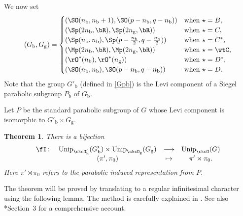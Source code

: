 \documentclass[12pt,a4paper]{amsart}
\numberwithin{equation}{section}
\newtheorem{thm}{Theorem}[section]
\theoremstyle{remark}
\def\Unip{\mathrm{Unip}}
\begin{document}
We now set
\[
  (G_{\mathrm b},G_{\mathrm g}) =
  \begin{cases}
    (\SO(n_{\mathrm b},n_{\mathrm b}+1),\SO(p-n_{\mathrm b},q-n_{\mathrm b})) & \text{when } \star = B, \\
    (\Sp(2n_{\mathrm b},\bR),\Sp(2n_{\mathrm g},\bR)) & \text{when } \star = C, \\
    (\Sp(n_{\mathrm b},n_{\mathrm b}), \Sp(p-\frac{n_{\mathrm b}}{2},q-\frac{n_{\mathrm b}}{2})) & \text{when } \star = C^{*}, \\
    (\Mp(2n_{\mathrm b},\bR),\Mp(2n_{\mathrm g},\bR)) & \text{when } \star = \wtC, \\
    (\rO^{*}(n_{\mathrm b}), \rO^{*}(n_{\mathrm g})) & \text{when } \star = D^{*}, \\
    (\SO(n_{\mathrm b},n_{\mathrm b}), \SO(p-n_{\mathrm b},q-n_{\mathrm b}) )& \text{when } \star = D. \\
  \end{cases}
\]
Note that the group $G'_{\mathrm b}$ (defined in \eqref{Gpb}) is the Levi component of a Siegel parabolic subgroup $P_{\mathrm b}$ of $G_{\mathrm b}$.

Let $P$ be the standard parabolic subgroup of $G$ whose Levi component is isomorphic to $G'_{\mathrm b}\times G_{\mathrm g}$.
\begin{thm}\label{thm:red}
  There is a bijection
  \begin{equation*}%
      \begin{array}{rccc}
    \fI\colon &   \Unip_{\ckcO'_{\mathrm b}}(G'_{\mathrm b})\times \Unip_{\ckcO_{\mathrm g}}(G_{\mathrm g})&         \longrightarrow &\Unip_{\ckcO}(G) \\
     &   (\pi',\pi_{0}) & \mapsto & \pi'\rtimes \pi_{0}.
      \end{array}
    \end{equation*}
    Here $\pi'\rtimes \pi_{0}$ refers to the parabolic induced representation from $P$.
  \end{thm}

The theorem will be proved by translating to a regular infinitesimal character using the following lemma.
 The method is carefully explained in \cite{Mat}. See also
\cite{GI}*{Section~3} for a comprehensive account.


\def\fhhaso{(\fhh^a_1)^*}
\def\fhhast{(\fhh^a_2)^*}
\newcommand{\ff}{f}
\newcommand{\ffcoh}{\varphi}
\end{document}
